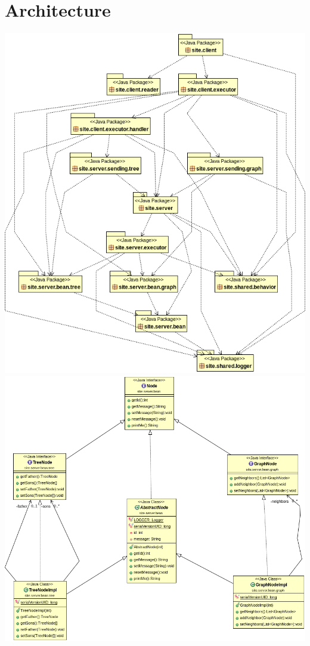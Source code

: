 \section*{Architecture}
\includegraphics[width=\textwidth]{../uml/overview.png}
\newpage
\includegraphics[width=\textwidth]{../uml/bean.png}
